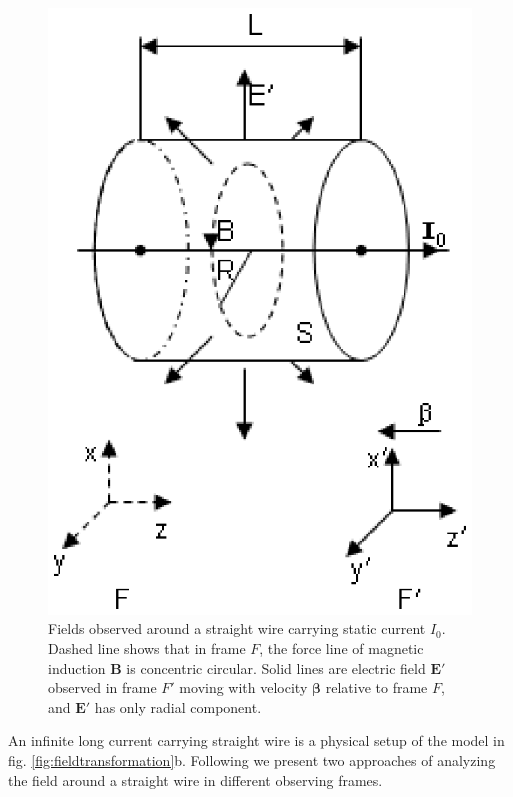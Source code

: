 \documentclass[prd,showpacs,twocolumn]{revtex4-1}
\begin{document}
\begin{figure}
\center
\includegraphics{DivE.eps}
\caption{Fields observed around a straight wire carrying static current $I_0$. Dashed line shows that in frame $F$, the force line of magnetic induction $\mathbf{B}$ is concentric circular. Solid lines are electric field $\mathbf{E'}$ observed in frame $F'$ moving with velocity $\boldsymbol\beta$ relative to frame $F$, and $\mathbf{E'}$ has only radial component.}
\label{fig:linecurrent}
\end{figure}

An infinite long current carrying straight wire is a physical setup of the model in fig. \ref{fig:fieldtransformation}b. Following we present two approaches of analyzing the field around a straight wire in different observing frames.
\end{document}
